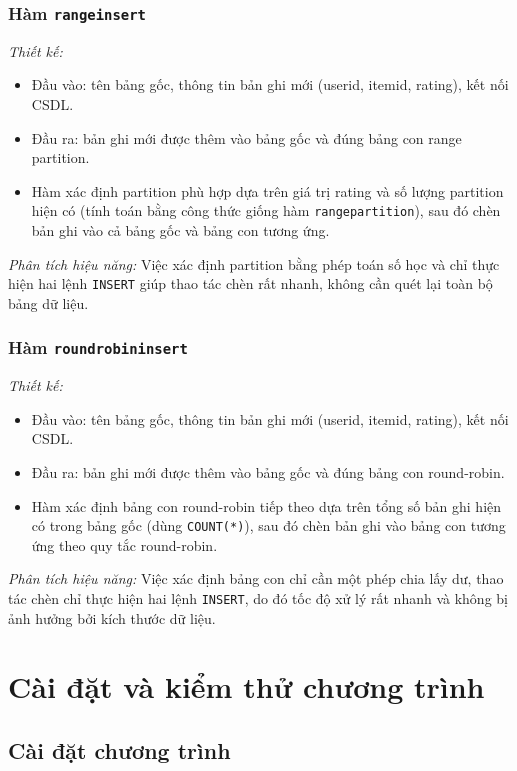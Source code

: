 \documentclass[14pt]{extarticle}
\begin{document}
\subsubsection{Hàm \texttt{rangeinsert}}

\textit{Thiết kế:}
\begin{itemize}
    \item Đầu vào: tên bảng gốc, thông tin bản ghi mới (userid, itemid, rating), kết nối CSDL.
    \item Đầu ra: bản ghi mới được thêm vào bảng gốc và đúng bảng con range partition.
    \item Hàm xác định partition phù hợp dựa trên giá trị rating và số lượng partition hiện có (tính toán bằng công thức giống hàm \texttt{rangepartition}), sau đó chèn bản ghi vào cả bảng gốc và bảng con tương ứng.
\end{itemize}
\textit{Phân tích hiệu năng:}  
Việc xác định partition bằng phép toán số học và chỉ thực hiện hai lệnh \texttt{INSERT} giúp thao tác chèn rất nhanh, không cần quét lại toàn bộ bảng dữ liệu.

\subsubsection{Hàm \texttt{roundrobininsert}}

\textit{Thiết kế:}
\begin{itemize}
    \item Đầu vào: tên bảng gốc, thông tin bản ghi mới (userid, itemid, rating), kết nối CSDL.
    \item Đầu ra: bản ghi mới được thêm vào bảng gốc và đúng bảng con round-robin.
    \item Hàm xác định bảng con round-robin tiếp theo dựa trên tổng số bản ghi hiện có trong bảng gốc (dùng \texttt{COUNT(*)}), sau đó chèn bản ghi vào bảng con tương ứng theo quy tắc round-robin.
\end{itemize}
\textit{Phân tích hiệu năng:}  
Việc xác định bảng con chỉ cần một phép chia lấy dư, thao tác chèn chỉ thực hiện hai lệnh \texttt{INSERT}, do đó tốc độ xử lý rất nhanh và không bị ảnh hưởng bởi kích thước dữ liệu.
\newpage

\section{Cài đặt và kiểm thử chương trình}
\subsection{Cài đặt chương trình}
\end{document}
